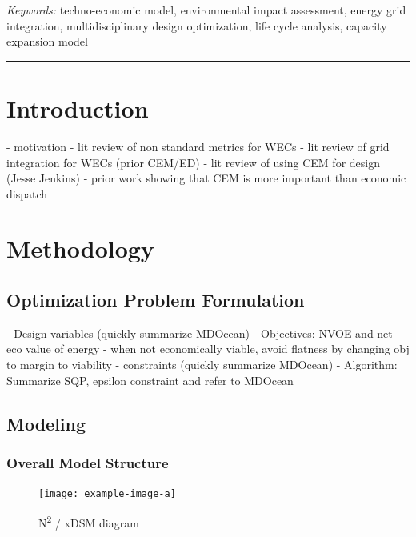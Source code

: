 \documentclass[10pt,twoside]{article}
\begin{document}
\vspace{.5\baselineskip}
\textit{Keywords:} techno-economic model, environmental impact assessment, energy grid integration, multidisciplinary design optimization, life cycle analysis, capacity expansion model

\noindent\rule{\textwidth}{0.4pt}

\section{Introduction}


    -  motivation
    -  lit review of non standard metrics for WECs
    -  lit review of grid integration for WECs (prior CEM/ED)
    -  lit review of using CEM for design (Jesse Jenkins)
    -  prior work showing that CEM is more important than economic dispatch


\lipsum[1]

\section{Methodology}
\subsection{Optimization Problem Formulation}

    -  Design variables (quickly summarize MDOcean)
    -  Objectives: NVOE and net eco value of energy
    -  when not economically viable, avoid flatness by changing obj to margin to viability
    -  constraints (quickly summarize MDOcean)
    -  Algorithm: Summarize SQP, epsilon constraint and refer to MDOcean


\lipsum[1]

\subsection{Modeling}
\subsubsection{Overall Model Structure}

\begin{figure}
    \centering
    \texttt{[image: example-image-a]}
    \caption{N\textsuperscript{2} / xDSM diagram}
    \label{fig:n2}
\end{figure}
\end{document}
